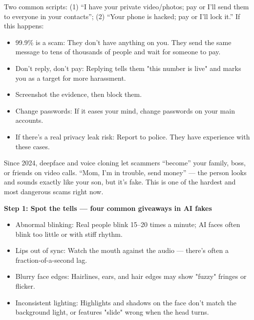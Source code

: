 
Two common scripts: (1) “I have your private video/photos; pay or I'll send them to everyone in your contacts”; (2) “Your phone is hacked; pay or I'll lock it.” If this happens:

\begin{itemize}
  \item 99.9\% is a scam: They don't have anything on you. They send the same message to tens of thousands of people and wait for someone to pay.
  \item Don't reply, don't pay: Replying tells them "this number is live" and marks you as a target for more harassment.
  \item Screenshot the evidence, then block them.
  \item Change passwords: If it eases your mind, change passwords on your main accounts.
  \item If there's a real privacy leak risk: Report to police. They have experience with these cases.
\end{itemize}


Since 2024, deepface and voice cloning let scammers “become” your family, boss, or friends on video calls. “Mom, I'm in trouble, send money” — the person looks and sounds exactly like your son, but it's fake. This is one of the hardest and most dangerous scams right now.

\textbf{Step 1: Spot the tells — four common giveaways in AI fakes}\par

\begin{itemize}
  \item Abnormal blinking: Real people blink 15–20 times a minute; AI faces often blink too little or with stiff rhythm.
  \item Lips out of sync: Watch the mouth against the audio — there's often a fraction-of-a-second lag.
  \item Blurry face edges: Hairlines, ears, and hair edges may show "fuzzy" fringes or flicker.
  \item Inconsistent lighting: Highlights and shadows on the face don't match the background light, or features "slide" wrong when the head turns.
\end{itemize}

